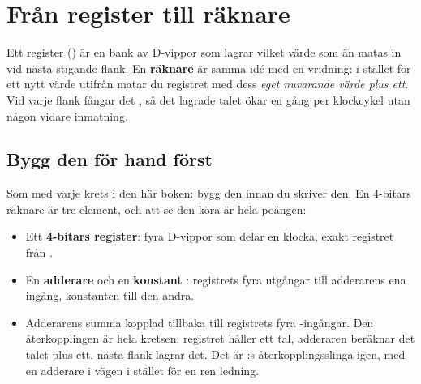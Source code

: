 
\section{Från register till räknare}
\label{c6:sec:counter}

Ett register () är en bank av D-vippor som lagrar vilket värde som än matas in vid
nästa stigande flank. En \textbf{räknare} är samma idé med en vridning: i stället för ett nytt värde
utifrån matar du registret med dess \emph{eget nuvarande värde plus ett}. Vid varje flank fångar det
, så det lagrade talet ökar en gång per klockcykel utan någon vidare
inmatning.

\subsection*{Bygg den för hand först}
Som med varje krets i den här boken: bygg den innan du skriver den. En 4-bitars räknare är tre
element, och att se den köra är hela poängen:
\begin{itemize}
  \item Ett \textbf{4-bitars register}: fyra D-vippor som delar en klocka, exakt registret från
    .
  \item En \textbf{adderare} och en \textbf{konstant }: registrets fyra utgångar till
    adderarens ena ingång, konstanten till den andra.
  \item Adderarens summa kopplad tillbaka till registrets fyra -ingångar. Den
    återkopplingen är hela kretsen: registret håller ett tal, adderaren beräknar det talet plus
    ett, nästa flank lagrar det. Det är :s återkopplingsslinga igen, med en
    adderare i vägen i stället för en ren ledning.
\end{itemize}


